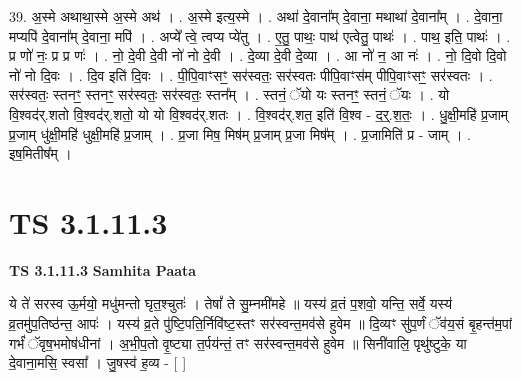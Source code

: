 \documentclass[17pt]{extarticle}
\begin{document}
39. अ॒स्मे अथाथा॒स्मे अ॒स्मे अथ॑ । . अ॒स्मे इत्य॒स्मे । . अथा॑ दे॒वाना᳚म् दे॒वाना॒ मथाथा॑ दे॒वाना᳚म् । . दे॒वाना॒ मप्यपि॑ दे॒वाना᳚म् दे॒वाना॒ मपि॑ । . अप्ये᳚ त्वे॒ त्वप्य प्ये॑तु । . ए॒तु॒ पाथः॒ पाथ॑ एत्वेतु॒ पाथः॑ । . पाथ॒ इति॒ पाथः॑ । . प्र णो॑ नः॒ प्र प्र णः॑ । . नो॒ दे॒वी दे॒वी नो॑ नो दे॒वी । . दे॒व्या दे॒वी दे॒व्या । . आ नो॑ न॒ आ नः॑ । . नो॒ दि॒वो दि॒वो नो॑ नो दि॒वः । . दि॒व इति॑ दि॒वः । . पी॒पि॒वाꣳसꣳ॒॒ सर॑स्वतः॒ सर॑स्वतः पीपि॒वाꣳस॑म् पीपि॒वाꣳसꣳ॒॒ सर॑स्वतः । . सर॑स्वतः॒ स्तनꣳ॒॒ स्तनꣳ॒॒ सर॑स्वतः॒ सर॑स्वतः॒ स्तन᳚म् । . स्तनं॒ ॅयो यः स्तनꣳ॒॒ स्तनं॒ ॅयः । . यो वि॒श्वद॑र्.शतो वि॒श्वद॑र्.शतो॒ यो यो वि॒श्वद॑र्.शतः । . वि॒श्वद॑र्.शत॒ इति॑ वि॒श्व - द॒र्॒.श॒तः॒ । . धु॒क्षी॒महि॑ प्र॒जाम् प्र॒जाम् धु॑क्षी॒महि॑ धुक्षी॒महि॑ प्र॒जाम् । . प्र॒जा मिष॒ मिष॑म् प्र॒जाम् प्र॒जा मिष᳚म् । . प्र॒जामिति॑ प्र - जाम् । . इष॒मितीष᳚म् । \newline
\pagebreak
{}

\section{ TS 3.1.11.3 }

\textbf{TS 3.1.11.3 } \newline
\textbf{Samhita Paata} \newline

ये ते॑ सरस्व ऊ॒र्मयो॒ मधु॑मन्तो घृत॒श्चुतः॑ । तेषां᳚ ते सु॒म्नमी॑महे ॥ यस्य॑ व्र॒तं प॒शवो॒ यन्ति॒ सर्वे॒ यस्य॑ व्र॒तमु॑प॒तिष्ठ॑न्त॒ आपः॑ । यस्य॑ व्र॒ते पु॑ष्टि॒पति॒र्निवि॑ष्ट॒स्तꣳ सर॑स्वन्त॒मव॑से हुवेम ॥ दि॒व्यꣳ सु॑प॒र्णं ॅव॑य॒सं बृ॒हन्त॑म॒पां गर्भं॑ ॅवृष॒भमोष॑धीनां । अ॒भी॒प॒तो वृ॒ष्ट्या त॒र्पय॑न्तं॒ तꣳ सर॑स्वन्त॒मव॑से हुवेम ॥ सिनी॑वालि॒ पृथु॑ष्टुके॒ या दे॒वाना॒मसि॒ स्वसा᳚ । जु॒षस्व॑ ह॒व्य - [  ] \newline
\end{document}
